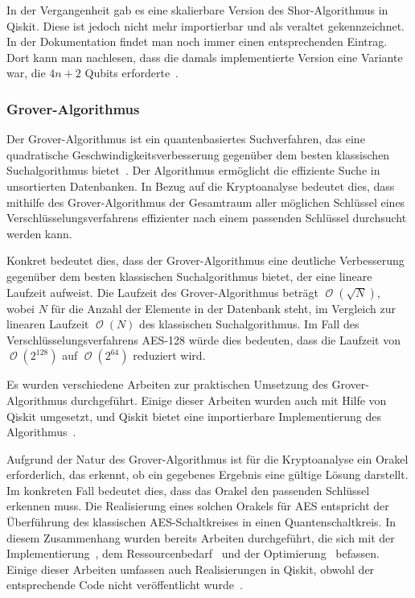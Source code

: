 \documentclass[
  a4paper, %
  10pt, %
  unnumberedsections, %
  twoside, %
]{LTJournalArticle}
\DeclareMathOperator{\Landau}{\mathcal{O}} %
\begin{document}
In der Vergangenheit gab es eine skalierbare Version des Shor-Algorithmus in Qiskit.
Diese ist jedoch nicht mehr importierbar und als veraltet gekennzeichnet.
In der Dokumentation findet man noch immer einen entsprechenden Eintrag.
Dort kann man nachlesen, dass die damals implementierte Version eine Variante war,
die \(4n+2\) Qubits erforderte~\autocite{IBM:Shor_docu}.

\subsubsection{Grover-Algorithmus}
Der Grover-Algorithmus ist ein quantenbasiertes Suchverfahren,
das eine quadratische Geschwindigkeitsverbesserung
gegenüber dem besten klassischen Suchalgorithmus bietet~\autocite{grover1996fast}.
Der Algorithmus ermöglicht die effiziente Suche in unsortierten Datenbanken.
In Bezug auf die Kryptoanalyse bedeutet dies,
dass mithilfe des Grover-Algorithmus der Gesamtraum aller möglichen Schlüssel
eines Verschlüsselungsverfahrens effizienter nach einem passenden Schlüssel durchsucht werden kann.

Konkret bedeutet dies,
dass der Grover-Algorithmus eine deutliche Verbesserung gegenüber dem besten klassischen Suchalgorithmus bietet,
der eine lineare Laufzeit aufweist.
Die Laufzeit des Grover-Algorithmus beträgt \(\Landau(\sqrt N)\),
wobei \(N\) für die Anzahl der Elemente in der Datenbank steht,
im Vergleich zur linearen Laufzeit \(\Landau(N)\) des klassischen Suchalgorithmus.
Im Fall des Verschlüsselungsverfahrens AES-128 würde dies bedeuten,
dass die Laufzeit von \(\Landau(2^{128})\) auf \(\Landau(2^{64})\) reduziert wird.

Es wurden verschiedene Arbeiten zur praktischen Umsetzung des Grover-Algorithmus durchgeführt.
Einige dieser Arbeiten wurden auch mit Hilfe von Qiskit umgesetzt,
und Qiskit bietet eine importierbare Implementierung des Algorithmus~\autocite{IBM:Grover}.

Aufgrund der Natur des Grover-Algorithmus ist für die Kryptoanalyse ein Orakel erforderlich,
das erkennt, ob ein gegebenes Ergebnis eine gültige Lösung darstellt.
Im konkreten Fall bedeutet dies, dass das Orakel den passenden Schlüssel erkennen muss.
Die Realisierung eines solchen Orakels für AES
entspricht der Überführung des klassischen AES-Schaltkreises in einen Quantenschaltkreis.
In diesem Zusammenhang wurden bereits Arbeiten durchgeführt,
die sich mit der Implementierung~\autocite{jaques2019implementing},
dem Ressourcenbedarf~\autocite{grassl2015applying} und der Optimierung~\autocite{Li2022} befassen.
Einige dieser Arbeiten umfassen auch Realisierungen in Qiskit,
obwohl der entsprechende Code nicht veröffentlicht wurde~\autocite{app11199085}.
\end{document}
